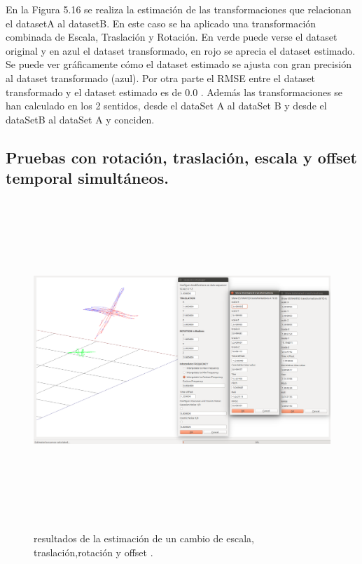 En la Figura 5.16 se realiza la estimación de las transformaciones que relacionan el datasetA al datasetB. En este caso se ha aplicado una transformación combinada de Escala, Traslación y Rotación. En verde puede verse el dataset original y en azul el dataset transformado, en rojo se aprecia el dataset estimado.
Se puede ver gráficamente cómo el dataset estimado se ajusta con gran precisión al dataset transformado (azul).
Por otra parte el RMSE entre el dataset transformado y el dataset estimado es de 0.0
. Además las transformaciones se han calculado en los 2 sentidos, desde el dataSet A  al dataSet B y desde el dataSetB al dataSet A y conciden.

\subsection{Pruebas con rotación, traslación, escala y offset temporal simultáneos.}
\begin{figure}[h]
\begin{center}
\label{fig:opciones de View}\includegraphics[height=12.0cm,width=18.0cm]{img/cap6/Escala_Trasla_Rota_Offset_abba.png}
\hspace{0.5cm}

\end{center}

\caption{ resultados de la estimación de un cambio de escala, traslación,rotación y offset .}
\end{figure}

